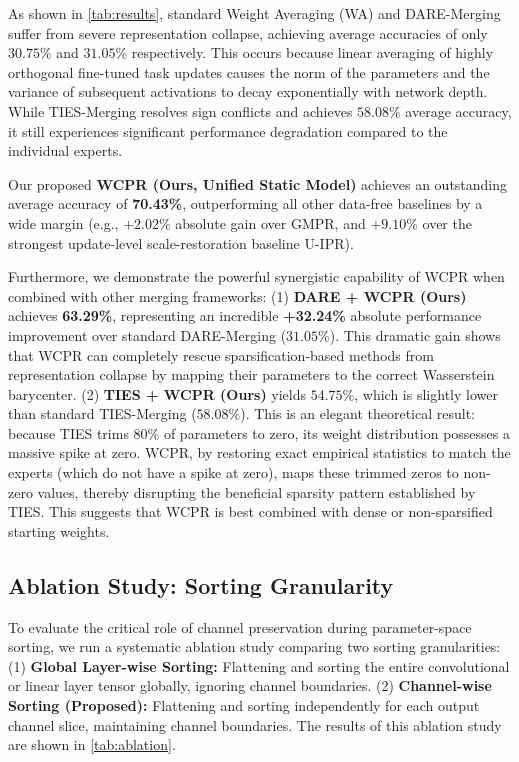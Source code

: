 \documentclass{article}
\theoremstyle{plain}
\theoremstyle{definition}
\theoremstyle{remark}
\begin{document}
As shown in \cref{tab:results}, standard Weight Averaging (WA) and DARE-Merging suffer from severe representation collapse, achieving average accuracies of only $30.75\%$ and $31.05\%$ respectively. This occurs because linear averaging of highly orthogonal fine-tuned task updates causes the norm of the parameters and the variance of subsequent activations to decay exponentially with network depth. While TIES-Merging resolves sign conflicts and achieves $58.08\%$ average accuracy, it still experiences significant performance degradation compared to the individual experts.

Our proposed \textbf{WCPR (Ours, Unified Static Model)} achieves an outstanding average accuracy of \textbf{70.43\%}, outperforming all other data-free baselines by a wide margin (e.g., $+2.02\%$ absolute gain over GMPR, and $+9.10\%$ over the strongest update-level scale-restoration baseline U-IPR). 

Furthermore, we demonstrate the powerful synergistic capability of WCPR when combined with other merging frameworks:
(1) \textbf{DARE + WCPR (Ours)} achieves \textbf{63.29\%}, representing an incredible \textbf{+32.24\%} absolute performance improvement over standard DARE-Merging ($31.05\%$). This dramatic gain shows that WCPR can completely rescue sparsification-based methods from representation collapse by mapping their parameters to the correct Wasserstein barycenter.
(2) \textbf{TIES + WCPR (Ours)} yields $54.75\%$, which is slightly lower than standard TIES-Merging ($58.08\%$). This is an elegant theoretical result: because TIES trims $80\%$ of parameters to zero, its weight distribution possesses a massive spike at zero. WCPR, by restoring exact empirical statistics to match the experts (which do not have a spike at zero), maps these trimmed zeros to non-zero values, thereby disrupting the beneficial sparsity pattern established by TIES. This suggests that WCPR is best combined with dense or non-sparsified starting weights.

\subsection{Ablation Study: Sorting Granularity}

To evaluate the critical role of channel preservation during parameter-space sorting, we run a systematic ablation study comparing two sorting granularities:
(1) \textbf{Global Layer-wise Sorting:} Flattening and sorting the entire convolutional or linear layer tensor globally, ignoring channel boundaries.
(2) \textbf{Channel-wise Sorting (Proposed):} Flattening and sorting independently for each output channel slice, maintaining channel boundaries.
The results of this ablation study are shown in \cref{tab:ablation}.
\end{document}
